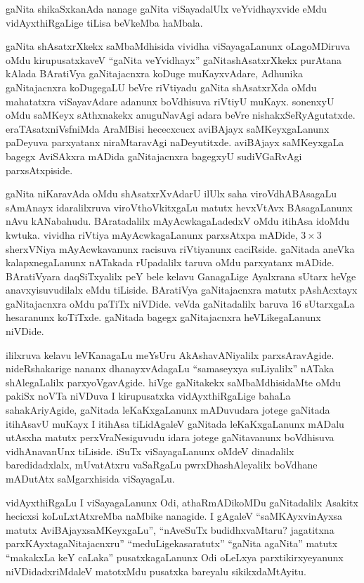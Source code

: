 gaNita shikaSxkanAda nanage gaNita viSayadalUlx veYvidhayxvide eMdu vidAyxthiRgaLige tiLisa beVkeMba haMbala.

gaNita shAsatxrXkekx saMbaMdhisida vividha viSayagaLanunx oLagoMDiruva oMdu kirupusatxkaveV ``gaNita veYvidhayx'' gaNitashAsatxrXkekx purAtana kAlada BAratiVya gaNitajacnxra koDuge muKayxvAdare, Adhunika gaNitajacnxra koDugegaLU beVre riVtiyadu gaNita shAsatxrXda oMdu mahatatxra viSayavAdare adanunx boVdhisuva riVtiyU muKayx. sonenxyU oMdu saMKeyx sAthxnakekx anuguNavAgi adara beVre nishakxSeRyAgutatxde. eraTAsatxniVsfniMda AraMBisi
hececxcucx aviBAjayx saMKeyxgaLanunx paDeyuva parxyatanx niraMtaravAgi naDeyu\-titxde. aviBAjayx saMKeyxgaLa bagegx AviSAkxra mADida gaNitajacnxra bagegxyU sudiVGaRvAgi parxsAtxpiside.

gaNita niKaravAda oMdu shAsatxrXvAdarU ilUlx saha viroVdhABAsagaLu sAmAnayx idaralilxruva viroVthoVkitxgaLu matutx hevxVtAvx BAsagaLanunx nAvu kANabahudu. BArata\-dalilx mAyAcwkagaLadedxV oMdu itihAsa idoMdu kwtuka. vividha riVtiya mAyA\-cwkagaLanunx parxsAtxpa mADide, $3\times 3$ sherxVNiya mAyAcwkavanunx racisuva riVtiyanunx caciRside. gaNitada aneVka kalapxnegaLanunx nATakada rUpadalilx taruva oMdu parxya\-tanx mADide. BAratiVyara daqSiTxyalilx peY bele kelavu GanagaLige Ayalxrana sUtarx heVge anavxyisuvudilalx eMdu tiLiside. BAratiVya gaNitajacnxra matutx pAshAcxtayx gaNitaja\-cnxra oMdu paTiTx niVDide. veVda gaNitadalilx baruva {\rm 16} sUtarxgaLa hesaranunx koTiTxde. gaNitada bagegx gaNitajacnxra heVLikegaLanunx niVDide.

ililxruva kelavu leVKanagaLu meYsUru AkAshavANiyalilx parxsAravAgide. nideR\-shakarige nananx dhanayxvAdagaLu ``samaseyxya suLiyalilx'' nATaka shAlegaLalilx parxyoVga\-vAgide. hiVge gaNitakekx saMbaMdhisidaMte oMdu pakiSx noVTa niVDuva I kirupusatxka vidAyxthiR\-gaLige bahaLa sahakAriyAgide, gaNitada leKaKxgaLanunx mADuvudara jotege gaNitada itihAsavU muKayx I itihAsa tiLidAgaleV gaNitada leKaKxgaLanunx mADalu utAsxha matutx perxVraNesiguvudu idara jotege gaNitavanunx boVdhisuva vidhAnavanUnx tiLiside. iSuTx viSayagaLanunx oMdeV dinadalilx baredidadxlalx, mUvatAtxru vaSaRgaLu pwrxDhashAle\-yalilx boVdhane mADutAtx saMgarxhisida viSayagaLu.

vidAyxthiRgaLu I viSayagaLanunx Odi, athaRmADikoMDu gaNitadalilx Asakitx\- hecicxsi\- koLuLxtAtxreMba naMbike nanagide. I gAgaleV ``saMKAyxvinAyxsa matutx AviBAjayx\break saMKeyxgaLu'',  ``nAveSuTx budidhxvaMtaru? jagatitxna parxKAyxtagaNitajacnxru'' ``meduLige\break kasaratutx'' ``gaNita agaNita'' matutx ``makakxLa keY caLaka'' pusatxkagaLanunx Odi oLeLxya parxtikirxyeyanunx niVDi\-dadxriMdaleV matotxMdu pusatxka bareyalu sikikxdaMtAyitu.

